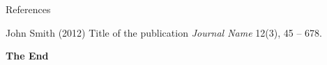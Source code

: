 \documentclass[aspectratio=169,xcolor=dvipsnames]{beamer}
\begin{document}

\begin{frame}{References}
    \footnotesize{
        \begin{thebibliography}{99}
             John Smith (2012)
            \newblock Title of the publication
            \newblock \emph{Journal Name} 12(3), 45 -- 678.
        \end{thebibliography}
    }
\end{frame}


\begin{frame}
    \Huge{\centerline{\textbf{The End}}}
\end{frame}

\end{document}
